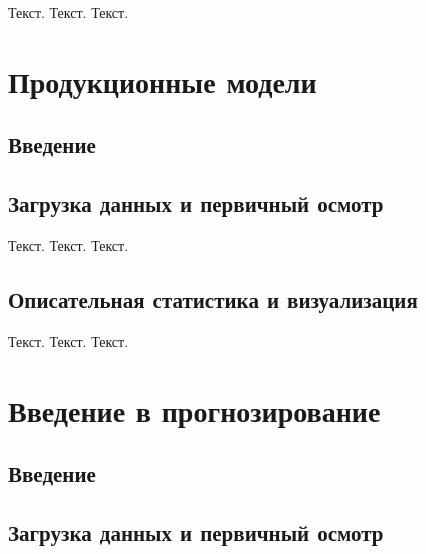 \documentclass[
  letterpaper,
  DIV=11,
  numbers=noendperiod]{scrreprt}
\begin{document}
Текст. Текст. Текст.


\chapter{Продукционные
модели}\label{ux43fux440ux43eux434ux443ux43aux446ux438ux43eux43dux43dux44bux435-ux43cux43eux434ux435ux43bux438}

\section{Введение}\label{ux432ux432ux435ux434ux435ux43dux438ux435-6}

\section{Загрузка данных и первичный
осмотр}\label{ux437ux430ux433ux440ux443ux437ux43aux430-ux434ux430ux43dux43dux44bux445-ux438-ux43fux435ux440ux432ux438ux447ux43dux44bux439-ux43eux441ux43cux43eux442ux440-5}

Текст. Текст. Текст.

\section{Описательная статистика и
визуализация}\label{ux43eux43fux438ux441ux430ux442ux435ux43bux44cux43dux430ux44f-ux441ux442ux430ux442ux438ux441ux442ux438ux43aux430-ux438-ux432ux438ux437ux443ux430ux43bux438ux437ux430ux446ux438ux44f-5}

Текст. Текст. Текст.


\chapter{Введение в
прогнозирование}\label{ux432ux432ux435ux434ux435ux43dux438ux435-ux432-ux43fux440ux43eux433ux43dux43eux437ux438ux440ux43eux432ux430ux43dux438ux435}

\section{Введение}\label{ux432ux432ux435ux434ux435ux43dux438ux435-7}

\section{Загрузка данных и первичный
осмотр}\label{ux437ux430ux433ux440ux443ux437ux43aux430-ux434ux430ux43dux43dux44bux445-ux438-ux43fux435ux440ux432ux438ux447ux43dux44bux439-ux43eux441ux43cux43eux442ux440-6}
\end{document}
